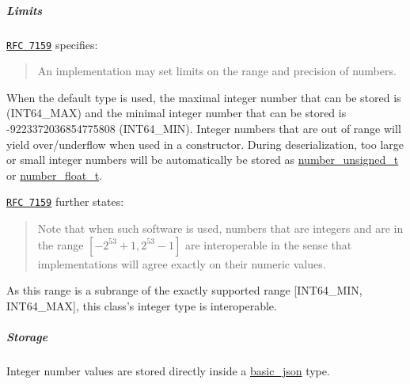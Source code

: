 \subparagraph*{Limits}

\href{http://rfc7159.net/rfc7159}{\tt R\-F\-C 7159} specifies\-: \begin{quotation}
An implementation may set limits on the range and precision of numbers.

\end{quotation}


When the default type is used, the maximal integer number that can be stored is {} (I\-N\-T64\-\_\-\-M\-A\-X) and the minimal integer number that can be stored is {\ttfamily -\/9223372036854775808} (I\-N\-T64\-\_\-\-M\-I\-N). Integer numbers that are out of range will yield over/underflow when used in a constructor. During deserialization, too large or small integer numbers will be automatically be stored as \hyperlink{classnlohmann_1_1basic__json_a60a04166c122072ab11eaf9845d9cd1d}{number\-\_\-unsigned\-\_\-t} or \hyperlink{classnlohmann_1_1basic__json_a74a0013e847fdc574b48f931f0e757e1}{number\-\_\-float\-\_\-t}.

\href{http://rfc7159.net/rfc7159}{\tt R\-F\-C 7159} further states\-: \begin{quotation}
Note that when such software is used, numbers that are integers and are in the range $[-2^{53}+1, 2^{53}-1]$ are interoperable in the sense that implementations will agree exactly on their numeric values.

\end{quotation}


As this range is a subrange of the exactly supported range \mbox{[}I\-N\-T64\-\_\-\-M\-I\-N, I\-N\-T64\-\_\-\-M\-A\-X\mbox{]}, this class's integer type is interoperable.

\subparagraph*{Storage}

Integer number values are stored directly inside a \hyperlink{classnlohmann_1_1basic__json}{basic\-\_\-json} type.

